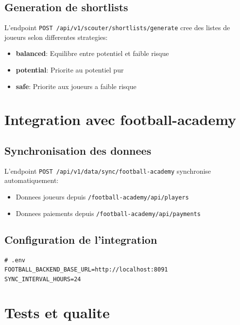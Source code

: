 \subsection*{Generation de shortlists}

L'endpoint \texttt{POST /api/v1/scouter/shortlists/generate} cree des listes de joueurs selon differentes strategies:

\begin{itemize}[leftmargin=*]
  \item \textbf{balanced}: Equilibre entre potentiel et faible risque
  \item \textbf{potential}: Priorite au potentiel pur
  \item \textbf{safe}: Priorite aux joueurs a faible risque
\end{itemize}

\section{Integration avec football-academy}

\subsection*{Synchronisation des donnees}

L'endpoint \texttt{POST /api/v1/data/sync/football-academy} synchronise automatiquement:

\begin{itemize}[leftmargin=*]
  \item Donnees joueurs depuis \texttt{/football-academy/api/players}
  \item Donnees paiements depuis \texttt{/football-academy/api/payments}
\end{itemize}

\subsection*{Configuration de l'integration}

\begin{lstlisting}[style=codeblock]
# .env
FOOTBALL_BACKEND_BASE_URL=http://localhost:8091
SYNC_INTERVAL_HOURS=24
\end{lstlisting}

\section{Tests et qualite}

